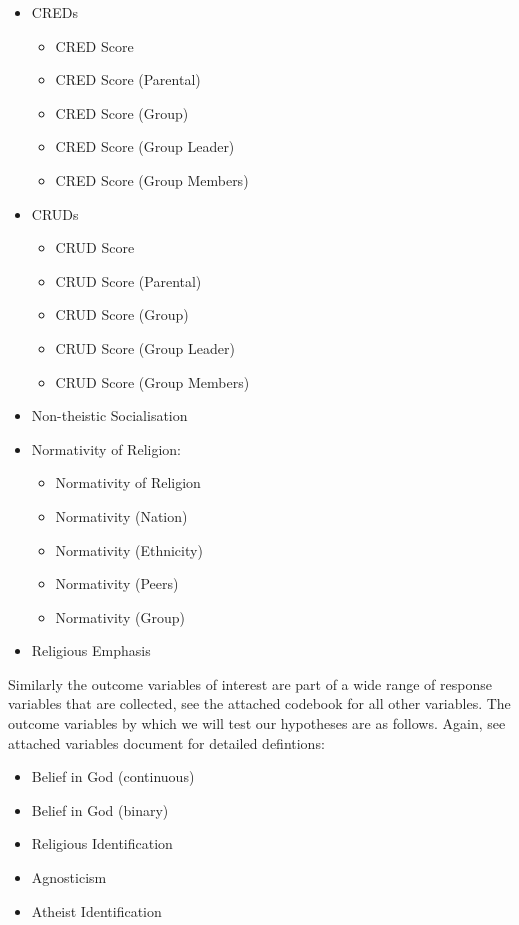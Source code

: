 \documentclass[]{article}
\providecommand{\tightlist}{%
\setlength{\itemsep}{0pt}\setlength{\parskip}{0pt}}
\begin{document}
\begin{itemize}
\item
  CREDs

  \begin{itemize}
  \item
    CRED Score
  \item
    CRED Score (Parental)
  \item
    CRED Score (Group)
  \item
    CRED Score (Group Leader)
  \item
    CRED Score (Group Members)
  \end{itemize}
\item
  CRUDs

  \begin{itemize}
  \item
    CRUD Score
  \item
    CRUD Score (Parental)
  \item
    CRUD Score (Group)
  \item
    CRUD Score (Group Leader)
  \item
    CRUD Score (Group Members)
  \end{itemize}
\item
  Non-theistic Socialisation
\item
  Normativity of Religion:

  \begin{itemize}
  \item
    Normativity of Religion
  \item
    Normativity (Nation)
  \item
    Normativity (Ethnicity)
  \item
    Normativity (Peers)
  \item
    Normativity (Group)
  \end{itemize}
\item
  Religious Emphasis
\end{itemize}

Similarly the outcome variables of interest are part of a wide range of
response variables that are collected, see the attached codebook for all
other variables. The outcome variables by which we will test our
hypotheses are as follows. Again, see attached variables document for
detailed defintions:

\begin{itemize}
\tightlist
\item
  Belief in God (continuous)
\item
  Belief in God (binary)
\item
  Religious Identification
\item
  Agnosticism
\item
  Atheist Identification
\end{itemize}
\end{document}
